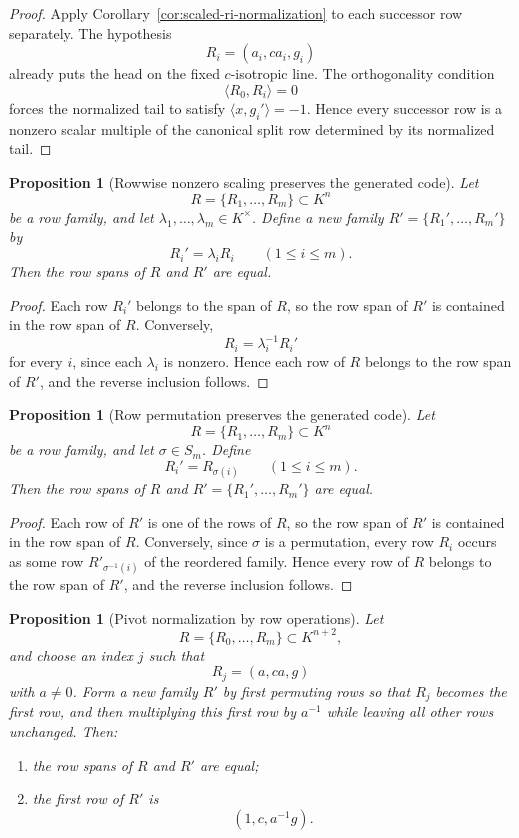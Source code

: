 \documentclass[12pt]{article}
\newtheorem{prop}[theorem]{Proposition}
\begin{document}
\begin{proof}
Apply Corollary~\ref{cor:scaled-ri-normalization} to each successor row separately. The hypothesis
\[
R_i=(a_i,c a_i,g_i)
\]
already puts the head on the fixed $c$-isotropic line. The orthogonality condition
\[
\langle R_0,R_i\rangle=0
\]
forces the normalized tail to satisfy $\langle x,g_i'\rangle=-1$. Hence every successor row is a nonzero scalar multiple of the canonical split row determined by its normalized tail.
\end{proof}

\begin{prop}[Rowwise nonzero scaling preserves the generated code]
\label{prop:row-scaling-same-code}
Let
\[
R=\{R_1,\dots,R_m\}\subset K^n
\]
be a row family, and let $\lambda_1,\dots,\lambda_m\in K^\times$. Define a new family $R'=\{R_1',\dots,R_m'\}$ by
\[
R_i'=\lambda_i R_i \qquad (1\le i\le m).
\]
Then the row spans of $R$ and $R'$ are equal.
\end{prop}

\begin{proof}
Each row $R_i'$ belongs to the span of $R$, so the row span of $R'$ is contained in the row span of $R$. Conversely,
\[
R_i=\lambda_i^{-1}R_i'
\]
for every $i$, since each $\lambda_i$ is nonzero. Hence each row of $R$ belongs to the row span of $R'$, and the reverse inclusion follows.
\end{proof}

\begin{prop}[Row permutation preserves the generated code]
\label{prop:row-permutation-same-code}
Let
\[
R=\{R_1,\dots,R_m\}\subset K^n
\]
be a row family, and let $\sigma\in S_m$. Define
\[
R_i' = R_{\sigma(i)} \qquad (1\le i\le m).
\]
Then the row spans of $R$ and $R'=\{R_1',\dots,R_m'\}$ are equal.
\end{prop}

\begin{proof}
Each row of $R'$ is one of the rows of $R$, so the row span of $R'$ is contained in the row span of $R$. Conversely, since $\sigma$ is a permutation, every row $R_i$ occurs as some row $R'_{\sigma^{-1}(i)}$ of the reordered family. Hence every row of $R$ belongs to the row span of $R'$, and the reverse inclusion follows.
\end{proof}

\begin{prop}[Pivot normalization by row operations]
\label{prop:pivot-normalization-row-ops}
Let
\[
R=\{R_0,\dots,R_m\}\subset K^{n+2},
\]
and choose an index $j$ such that
\[
R_j=(a,c a,g)
\]
with $a\neq 0$. Form a new family $R'$ by first permuting rows so that $R_j$ becomes the first row, and then multiplying this first row by $a^{-1}$ while leaving all other rows unchanged. Then:
\begin{enumerate}
\item the row spans of $R$ and $R'$ are equal;
\item the first row of $R'$ is
\[
(1,c,a^{-1}g).
\]
\end{enumerate}
\end{prop}
\end{document}
